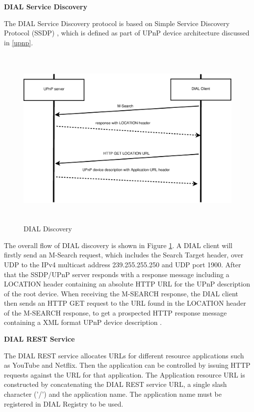 \textbf{DIAL Service Discovery}

The DIAL Service Discovery protocol is based on Simple Service Discovery 
Protocol (SSDP) \cite{ssdp_rfc}, which is defined as part of UPnP device
architecture discussed in \ref{upnp}.

\begin{figure}[htb] \centering 
\includegraphics[height=9cm]{charts/dial_discovery} 
\caption{DIAL Discovery \label{dial_discovery}} 
\end{figure} 

The overall flow of DIAL discovery is shown in Figure \ref{dial_discovery}. A
DIAL client will firstly send an M-Search request, which includes  the Search
Target header, over UDP to the IPv4 multicast address 239.255.255.250 and UDP
port 1900. After that the SSDP/UPnP server responds with a response message
including a LOCATION header containing an absolute HTTP URL for the UPnP
description of the root device. When receiving the M-SEARCH response, the DIAL
client then sends an HTTP GET request to the URL found in the LOCATION header
of the M-SEARCH response, to get a prospected HTTP response message containing
a XML format UPnP device description \cite{dial}. 

\textbf{DIAL REST Service}

The DIAL REST service allocates URLs for different resource applications such as 
YouTube and Netflix. Then the application can be controlled by issuing HTTP 
requests against the URL for that application. The Application resource URL is 
constructed by concatenating the DIAL REST service URL, a single slash character 
('/') and the application name. The application name must be registered in DIAL 
Registry to be used.

